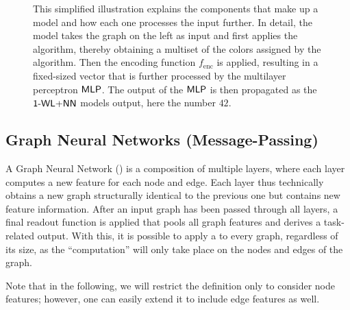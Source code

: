\begin{figure}[!htb]
    \centering
    
    \caption{This simplified illustration explains the components that make up a \wlnn model and how each one processes the input further. In detail, the model takes the graph on the left as input and first applies the \wl algorithm, thereby obtaining a multiset of the colors assigned by the algorithm. Then the encoding function $f_\text{enc}$ is applied, resulting in a fixed-sized vector that is further processed by the multilayer perceptron $\textsf{MLP}$. The output of the $\textsf{MLP}$ is then propagated as the $\textsf{1-WL+NN}$ models output, here the number $42$.}
    \label{fig:wlnn}
\end{figure}

\subsection{Graph Neural Networks (Message-Passing)}\label{sec:GNN Defintion}
A \textsf{Graph Neural Network} (\gnn) is a composition of multiple layers, where each layer computes a new feature for each node and edge. Each \gnn layer thus technically obtains a new graph structurally identical to the previous one but contains new feature information. After an input graph has been passed through all layers, a final readout function is applied that pools all graph features and derives a task-related output. With this, it is possible to apply a \gnn to every graph, regardless of its size, as the ``computation'' will only take place on the nodes and edges of the graph.

Note that in the following, we will restrict the definition only to consider node features; however, one can easily extend it to include edge features as well.

